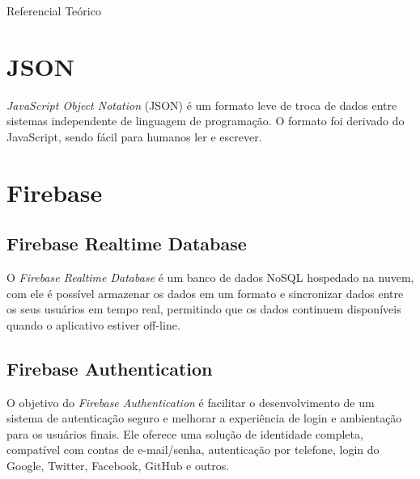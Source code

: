 \documentclass[
	12pt,				%
	openright,			%
	twoside,			%
	a4paper,			%
	english,			%
	french,				%
	spanish,			%
	brazil				%
	]{abntex2}
\begin{document}
\begin{chapter}{Referencial Teórico}
\newpage
\section{JSON} \label{JSON}
\textit{JavaScript Object Notation} (JSON) é um formato leve de troca de dados entre sistemas independente de linguagem de programação. O formato foi derivado do JavaScript, sendo fácil para humanos ler e escrever.

\section{Firebase}
\subsection{Firebase Realtime Database} \label{Firebase Realtime Database}
O \textit{Firebase Realtime Database} é um banco de dados NoSQL hospedado na nuvem, com ele é possível armazenar os dados em um formato  e sincronizar dados entre os seus usuários em tempo real, permitindo que os dados continuem disponíveis quando o aplicativo estiver off-line.

\subsection{Firebase Authentication}
O objetivo do \textit{Firebase Authentication} é facilitar o desenvolvimento de um sistema de autenticação seguro e melhorar a experiência de login e ambientação para os usuários finais. Ele oferece uma solução de identidade completa, compatível com contas de e-mail/senha, autenticação por telefone, login do Google, Twitter, Facebook, GitHub e outros.

\end{chapter}
\end{document}
